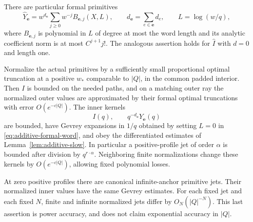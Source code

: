 \begin{lemma}\label{lem:additive-primitives}
There are particular formal primitives
\begin{equation}\label{eq:additive-formal-word}
 \widehat Y_{\mathbf e}
 =w^{d_{\mathbf e}}\sum_{j\ge0}w^{-j}B_{\mathbf e,j}(X,L),
 \qquad d_{\mathbf e}=\sum_{e\in\mathbf e}d_e,
 \qquad L=\log(w/q),
\end{equation}
where $B_{\mathbf e,j}$ is polynomial in $L$ of degree at most the
word length and its analytic coefficient norm is at most $C^{j+1}j!$.
The analogous assertion holds for $\widehat I$ with $d=0$ and length one.

Normalize the actual primitives by a sufficiently small proportional
optimal truncation at a positive $w_*$ comparable to $|Q|$, in the common
padded interior.  Then $I$ is bounded on the needed paths, and on a
matching outer ray the normalized outer values are approximated by
their formal optimal truncations with error $O(e^{-c|Q|})$.
The inner kernels
\begin{equation}\label{eq:additive-inner-kernels}
 I(q),\qquad q^{-d_{\mathbf e}}Y_{\mathbf e}(q)
\end{equation}
are bounded, have Gevrey expansions in $1/q$ obtained by setting $L=0$
in \eqref{eq:additive-formal-word}, and obey the differentiated estimates
of Lemma~\ref{lem:additive-slow}.  In particular a positive-profile jet
of order $\alpha$ is bounded after division by $q^{r\cdot\alpha}$.
Neighboring finite normalizations change these kernels by
$O(e^{-c|Q|})$, allowing fixed polynomial losses.

At zero positive profiles there are canonical infinite-anchor primitive
jets.  Their normalized inner values have the same Gevrey estimates.
For each fixed jet and each fixed $N$, finite and infinite normalized
jets differ by $O_N(|Q|^{-N})$.  This last assertion is power accuracy,
and does not claim exponential accuracy in $|Q|$.
\end{lemma}

